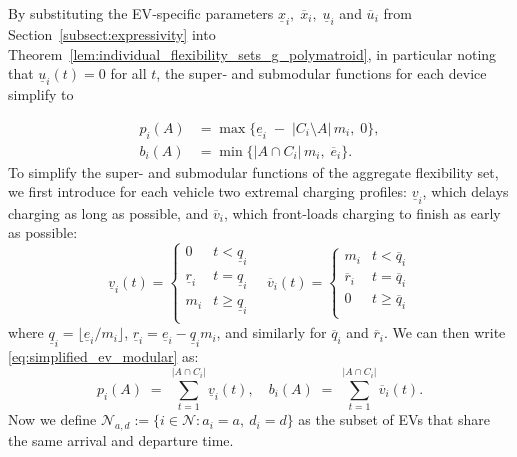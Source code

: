 By substituting the EV‐specific parameters \(\underline{x}_i,\;\overline{x}_i,\;\underline{u}_i\) and \(\overline{u}_i\) from Section~\ref{subsect:expressivity} into 
Theorem~\ref{lem:individual_flexibility_sets_g_polymatroid}, in particular noting that $\underline{u}_i(t) = 0$ for all $t$, the super‐ and submodular functions for each device simplify to

\begin{subequations}\label{eq:simplified_ev_modular}
\begin{align}
    p_i(A) &= \max\bigl\{\underline{e}_i \;-\; \lvert C_i \setminus A\rvert\,m_i,\; 0\bigr\},\\
    b_i(A) &= \min\bigl\{\lvert A \cap C_i\rvert\,m_i,\;\overline{e}_i\bigr\}.
\end{align}
\end{subequations}
To simplify the super- and submodular functions of the aggregate flexibility set, we first introduce for each vehicle two extremal charging profiles: \(\underline{v}_i\), which delays charging as long as possible, and \(\overline{v}_i\), which front‐loads charging to finish as early as possible:
\begin{equation*}
        \underline{v}_i(t) = 
        \begin{cases}
            0                        & t <  \underline{q}_i \\
            \underline{r}_i          & t =  \underline{q}_i \\
            m_i                      & t \geq  \underline{q}_i \\
        \end{cases}
\quad
        \overline{v}_i(t) = 
        \begin{cases}
            m_i                    & t <  \overline{q}_i \\
            \overline{r}_i         & t =  \overline{q}_i \\
            0                      & t \geq \overline{q}_i \\
        \end{cases}
    \end{equation*}
where $\underline{q}_i = \lfloor \underline{e}_i / m_i \rfloor$, $\underline{r}_i = \underline{e}_i - \underline{q}_i m_i$, and similarly for $\overline{q}_i$ and $\overline{r}_i$. We can then write \eqref{eq:simplified_ev_modular} as:
\[
    p_i(A) \;=\;\sum_{t=1}^{|A \cap C_i|} \underline{v}_i(t), 
    \quad
    b_i(A) \;=\;\sum_{t=1}^{|A \cap C_i|} \overline{v}_i(t).
\]
Now we define $ \mathcal{N}_{a,d} := \{i\in\mathcal{N} : a_i = a,\ d_i = d\}$ as the subset of EVs that share the same arrival and departure time. 

